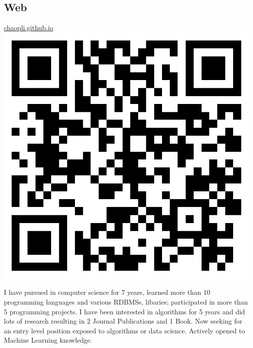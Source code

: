 \documentclass[]{friggeri-cv}
\begin{document}
\begin{aside}
	\section{Web}
	\href{http://chaopli.github.io}{chaopli.github.io}
	\includegraphics[scale=0.1]{img/Chao_Li.png}
\end{aside}


I have pursued in computer science for 7 years, learned more than 10 programming languages and various RDBMSs, libaries; participated in more than 5 programming projects. I have been interested in algorithms for 5 years and did lots of research resulting in 2 Journal Publications and 1 Book. Now seeking for an entry level position exposed to algorithms or data science. Actively opened to Machine Learning knowledge.
\end{document}
